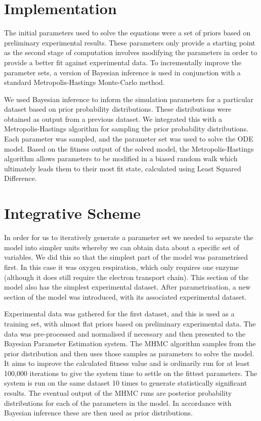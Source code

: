 \section{Implementation}
The initial parameters used to solve the equations were a set of priors based on preliminary experimental results. These parameters only provide a starting point as the second stage of computation involves modifying the parameters in order to provide a better fit against experimental data. To incrementally improve the parameter sets, a version of Bayesian inference is used in conjunction with a standard Metropolis-Hastings Monte-Carlo method.

We used Bayesian inference to inform the simulation parameters for a particular dataset based on prior probability distributions. These distributions were obtained as output from a previous dataset. We integrated this with a Metropolis-Hastings algorithm for sampling the prior probability distributions. Each parameter was sampled, and the parameter set was used to solve the ODE model. Based on the fitness output of the solved model, the Metropolis-Hastings algorithm allows parameters to be modified in a biased random walk which ultimately leads them to their most fit state, calculated using Least Squared Difference.

\section{Integrative Scheme}
In order for us to iteratively generate a parameter set we needed to separate the model into simpler units whereby we can obtain data about a specific set of variables. We did this so that the simplest part of the model was parametrised first. In this case it was oxygen respiration, which only requires one enzyme (although it does still require the electron transport chain). This section of the model also has the simplest experimental dataset. After parametrisation, a new section of the model was introduced, with its associated experimental dataset.

Experimental data was gathered for the first dataset, and this is used as a training set, with almost flat priors based on preliminary experimental data. The data was pre-processed and normalised if necessary and then presented to the Bayesian Parameter Estimation system. The MHMC algorithm samples from the prior distribution and then uses those samples as parameters to solve the model. It aims to improve the calculated fitness value and is ordinarily run for at least 100,000 iterations to give the system time to settle on the fittest parameters. The system is run on the same dataset 10 times to generate statistically significant results. The eventual output of the MHMC runs are posterior probability distributions for each of the parameters in the model. In accordance with Bayesian inference these are then used as prior distributions.

